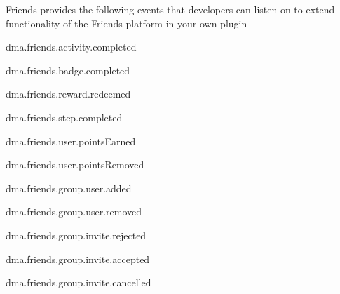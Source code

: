 Friends provides the following events that developers can listen on to extend functionality of the Friends platform in your own plugin


\begin{DoxyItemize}
\item dma.\-friends.\-activity.\-completed
\item dma.\-friends.\-badge.\-completed
\item dma.\-friends.\-reward.\-redeemed
\item dma.\-friends.\-step.\-completed
\item dma.\-friends.\-user.\-points\-Earned
\item dma.\-friends.\-user.\-points\-Removed
\item dma.\-friends.\-group.\-user.\-added
\item dma.\-friends.\-group.\-user.\-removed
\item dma.\-friends.\-group.\-invite.\-rejected
\item dma.\-friends.\-group.\-invite.\-accepted
\item dma.\-friends.\-group.\-invite.\-cancelled 
\end{DoxyItemize}